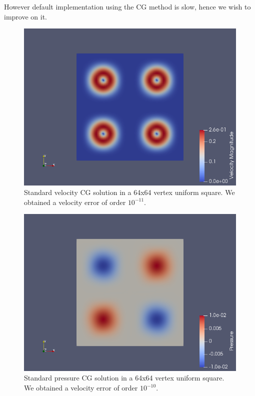 \documentclass[11pt,twoside,a4paper]{article}
\begin{document}
However default implementation using the CG method is slow, hence we wish to improve on it.
\begin{figure}
  \includegraphics[width=\linewidth]{lgv.png}
  \caption{Standard velocity CG solution in a 64x64 vertex uniform square. We obtained a velocity error of order $10^{-11}$.}
\end{figure}
\begin{figure}
  \includegraphics[width=\linewidth]{lgp.png}
  \caption{Standard pressure CG solution in a 64x64 vertex uniform square. We obtained a velocity error of order $10^{-10}$.}
\end{figure}
\end{document}
